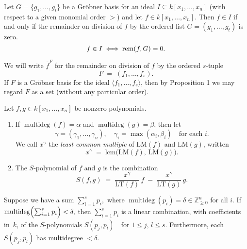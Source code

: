 \begin{corollary}\label{cor:GB_membership_test} %
    Let $G = \{g_1, \dots , g_t\}$ be a Gr{\"o}bner basis for an ideal $I \subseteq k[x_1, \dots , x_n]$
    (with respect to a given monomial order $>$) and let $f \in k[x_1, \dots , x_n]$.
    Then $f \in I$ if and only if the remainder on division of $f$ by the ordered list
    $G = (g_1, \dots, g_t)$ is zero.
    \[ f \in I \iff \operatorname{rem}(f, G) = 0. \]
\end{corollary}

\begin{definition}\label{def:Remainder} %
    We will write \(\overline{f}^F\) for the remainder on division of \(f\) by the ordered \(s\)-tuple
    \[
    F \;=\;(f_1,\dots,f_s).
    \]
    If \(F\) is a Gr{\"o}bner basis for the ideal \(\langle f_1,\dots,f_s\rangle\), then by Proposition 1
    we may regard \(F\) as a set (without any particular order).
\end{definition}

\begin{definition}\label{def:S-polynomial} %
    \leanok %
    Let \(f,g\in k[x_1,\dots,x_n]\) be nonzero polynomials.
    \begin{enumerate}
      \item If \(\operatorname{multideg}(f)=\alpha\) and \(\operatorname{multideg}(g)=\beta\), 
        then let 
        \[
          \gamma = (\gamma_1,\dots,\gamma_n),
          \quad
          \gamma_i = \max(\alpha_i,\beta_i)
          \quad\text{for each }i.
        \]
        We call \(x^\gamma\) the \emph{least common multiple} of \(\mathrm{LM}(f)\) and \(\mathrm{LM}(g)\),
        written
        \[
          x^\gamma \;=\;\mathrm{lcm}\bigl(\mathrm{LM}(f),\,\mathrm{LM}(g)\bigr).
        \]
      \item The \(S\)-polynomial of \(f\) and \(g\) is the combination
        \[
          S(f,g)
          \;=\;
          \frac{x^\gamma}{\mathrm{LT}(f)}\,f
          \;-\;
          \frac{x^\gamma}{\mathrm{LT}(g)}\,g.
        \]
    \end{enumerate}
\end{definition}

\begin{lemma}\label{lem:exists_S_polynomial_syzygies} %
    Suppose we have a sum $\sum_{i=1}^s p_i,$ where $\operatorname{multideg}(p_i)=\delta\in\mathbb Z_{\ge0}^n$ for all $i$.
    If $\operatorname{multideg}\Bigl(\sum_{i=1}^s p_i\Bigr)<\delta,$ then $\sum_{i=1}^s p_i$ is a linear combination, with coefficients in~$k$, of the $S$-polynomials $S(p_j,p_l)\quad\text{for }1\le j,\,l\le s$.
    Furthermore, each $S(p_j,p_l)$ has multidegree $<\delta$.
\end{lemma}

